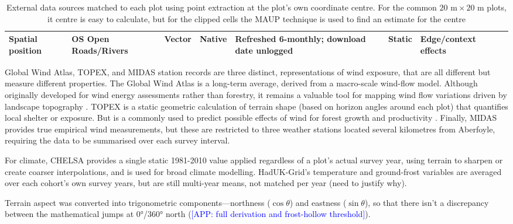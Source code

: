 \documentclass[logo,msc,ai]{infthesis}           %
\newcommand{\app}[1]{\textcolor{blue}{[APP: #1]}}
\begin{document}
\begin{table}[!htbp]
\begin{tabular}{p{1.6cm}p{2.1cm}p{1.6cm}p{1.5cm}p{2.3cm}p{1.6cm}p{2.3cm}p{0.7cm}}
Spatial position & OS Open Roads/Rivers & Vector & Native & Refreshed 6-monthly; download date unlogged & Static & Edge/context effects & \cite{ordnancesurveyOpenRoads_C3_LID, ordnancesurveyOpenRivers_C3_LID} \\
\hline
\end{tabular}
\caption{External data sources matched to each plot using point extraction at the plot's own
coordinate centre. For the common $20\text{~m} \times 20\text{~m}$ plots, it centre is easy to calculate, but for the clipped cells the MAUP technique is used to find an estimate for the centre \cite{openshaw1984Modifiable_C5_EVAL}}
\label{tab:data-env-sources}
\end{table}

Global Wind Atlas, TOPEX, and MIDAS station records are three distinct, representations of wind exposure, that are all different but measure different properties. The Global Wind Atlas is a long-term average, derived from a macro-scale wind-flow model. Although originally developed for wind energy assessments rather than forestry, it remains a valuable tool for mapping wind flow variations driven by landscape topography \cite{dtu2019Global_C1_SS}. TOPEX is a static geometric calculation of terrain shape (based on horizon angles around each plot) that quantifies local shelter or exposure. But is a commonly used to predict possible effects of wind for forest growth and productivity \cite{worrell1987Predicting_C1_SS}. Finally, MIDAS provides true empirical wind measurements, but these are restricted to three weather stations located several kilometres from Aberfoyle, requiring the data to be summarised over each survey interval.

For climate, CHELSA provides a single static 1981-2010 value applied regardless of a plot's actual survey year, using terrain to sharpen or create coarser interpolations, and is used for broad climate modelling. HadUK-Grid's temperature and ground-frost variables are averaged over each cohort's own survey years, but are still multi-year means, not matched per year (need to justify why). 

Terrain aspect was converted into trigonometric components—northness ($\cos\theta$) and eastness ($\sin\theta$), so that there isn't a discrepancy between the mathematical jumps at 0°/360° north \cite{moisen2002Comparing_C3_LID} (\app{full derivation and frost-hollow threshold}).


\end{document}
